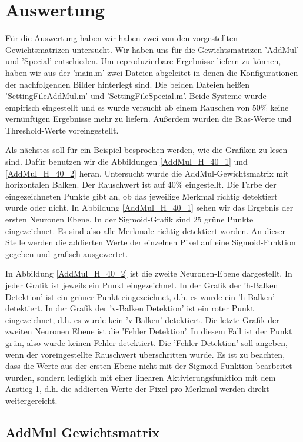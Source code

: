 \newpage
\section{Auswertung}
Für die Auswertung haben wir haben zwei von den vorgestellten Gewichtsmatrizen untersucht. Wir haben uns für die Gewichtsmatrizen 'AddMul' und 'Special' entschieden. Um reproduzierbare Ergebnisse liefern zu können, haben wir aus der 'main.m' zwei Dateien abgeleitet in denen die Konfigurationen der nachfolgenden Bilder hinterlegt sind. Die beiden Dateien heißen 'SettingFileAddMul.m' und 'SettingFileSpecial.m'. Beide Systeme wurde empirisch eingestellt und es wurde versucht ab einem Rauschen von 50\% keine vernünftigen Ergebnisse mehr zu liefern. Außerdem wurden die Bias-Werte und Threshold-Werte voreingestellt.

Als nächstes soll für ein Beispiel besprochen werden, wie die Grafiken zu lesen sind. Dafür benutzen wir die Abbildungen \ref{AddMul_H_40_1} und \ref{AddMul_H_40_2} heran. Untersucht wurde die AddMul-Gewichtsmatrix mit horizontalen Balken. Der Rauschwert ist auf 40\% eingestellt. Die Farbe der eingezeichneten Punkte gibt an, ob das jeweilige Merkmal richtig detektiert wurde oder nicht. In Abbildung \ref{AddMul_H_40_1} sehen wir das Ergebnis der ersten Neuronen Ebene. In der Sigmoid-Grafik sind 25 grüne Punkte eingezeichnet. Es sind also alle Merkmale richtig detektiert worden. An dieser Stelle werden die addierten Werte der einzelnen Pixel auf eine Sigmoid-Funktion gegeben und grafisch ausgewertet.

In Abbildung \ref{AddMul_H_40_2} ist die zweite Neuronen-Ebene dargestellt. In jeder Grafik ist jeweils ein Punkt eingezeichnet. In der Grafik der 'h-Balken Detektion' ist ein grüner Punkt eingezeichnet, d.h. es wurde ein 'h-Balken' detektiert. In der Grafik der 'v-Balken Detektion' ist ein roter Punkt eingezeichnet, d.h. es wurde kein 'v-Balken' detektiert. Die letzte Grafik der zweiten Neuronen Ebene ist die 'Fehler Detektion'. In diesem Fall ist der Punkt grün, also wurde keinen Fehler detektiert. Die 'Fehler Detektion' soll angeben, wenn der voreingestellte Rauschwert überschritten wurde. Es ist zu beachten, dass die Werte aus der ersten Ebene nicht mit der Sigmoid-Funktion bearbeitet wurden, sondern lediglich mit einer linearen Aktivierungsfunktion mit dem Anstieg 1, d.h. die addierten Werte der Pixel pro Merkmal werden direkt weitergereicht.  

\newpage
\subsection{AddMul Gewichtsmatrix}
